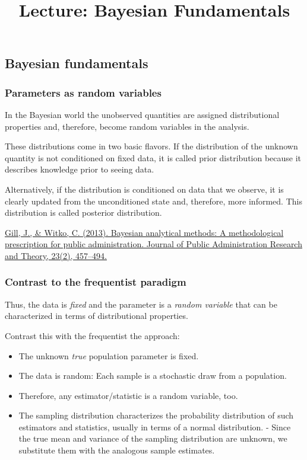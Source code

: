 \documentclass[
  11pt,
]{article}
\title{Lecture: Bayesian Fundamentals}
\author{}
\date{\vspace{-2.5em}}
\providecommand{\tightlist}{%
  \setlength{\itemsep}{0pt}\setlength{\parskip}{0pt}}
\begin{document}
\maketitle

\hypertarget{bayesian-fundamentals}{%
\subsection{Bayesian fundamentals}\label{bayesian-fundamentals}}

\hypertarget{parameters-as-random-variables}{%
\subsubsection{Parameters as random variables}\label{parameters-as-random-variables}}

In the Bayesian world the unobserved quantities are assigned
distributional properties and, therefore, become random variables in the
analysis.

These distributions come in two basic flavors. If the distribution
of the unknown quantity is not conditioned on fixed data, it is called
prior distribution because it describes knowledge prior to seeing data.

Alternatively, if the distribution is conditioned on data that we
observe, it is clearly updated from the unconditioned state and,
therefore, more informed. This distribution is called posterior
distribution.

\href{https://academic.oup.com/jpart/article/23/2/457/1003493}{Gill, J., \& Witko, C. (2013). Bayesian analytical methods: A
methodological prescription for public administration. Journal of Public
Administration Research and Theory, 23(2),
457--494.}

\hypertarget{contrast-to-the-frequentist-paradigm}{%
\subsubsection{Contrast to the frequentist paradigm}\label{contrast-to-the-frequentist-paradigm}}

Thus, the data is \emph{fixed} and the parameter is a \emph{random variable} that
can be characterized in terms of distributional properties.

Contrast this with the frequentist the approach:

\begin{itemize}
\tightlist
\item
  The unknown \emph{true} population parameter is fixed.
\item
  The data is random: Each sample is a stochastic draw from a
  population.
\item
  Therefore, any estimator/statistic is a random variable, too.
\item
  The sampling distribution characterizes the probability distribution
  of such estimators and statistics, usually in terms of a normal
  distribution. - Since the true mean and variance of the sampling
  distribution are unknown, we substitute them with the analogous
  sample estimates.
\end{itemize}
\end{document}
